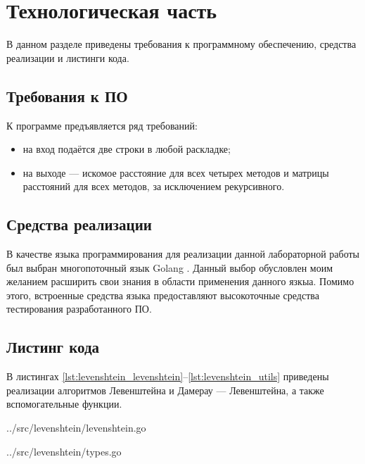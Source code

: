 \chapter{Технологическая часть}

В данном разделе приведены требования к программному обеспечению, средства реализации и листинги кода.

\section{Требования к ПО}

К программе предъявляется ряд требований:
\begin{itemize}
	\item на вход подаётся две строки в любой раскладке;
	\item на выходе — искомое расстояние для всех четырех методов и матрицы расстояний для всех методов, за исключением рекурсивного.
\end{itemize}

\section{Средства реализации}

В качестве языка программирования для реализации данной лабораторной работы был выбран многопоточный язык Golang \cite{golang}. Данный выбор обусловлен моим желанием расширить свои знания в области применения данного язкыа. Помимо этого, встроенные средства языка предоставляют высокоточные средства тестирования разработанного ПО.

\section{Листинг кода}

В листингах \ref{lst:levenshtein_levenshtein}--\ref{lst:levenshtein_utils} приведены реализации алгоритмов Левенштейна и Дамерау — Левенштейна, а также вспомогательные функции.

\begin{lstinputlisting}[
	caption={Функции реализации алгоритмов Левенштейна и Дамерау -- Левенштейна},
	label={lst:levenshtein_levenshtein},
	style={go}
]{../src/levenshtein/levenshtein.go}
\end{lstinputlisting}

\begin{lstinputlisting}[
	caption={Пользовательские типы данных},
	label={lst:levenshtein_types},
	style={go}
	]{../src/levenshtein/types.go}
\end{lstinputlisting}

